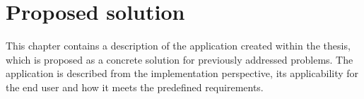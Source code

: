 \chapter{Proposed solution}

This chapter contains a description of the application created within the thesis, which is proposed as a concrete solution for previously addressed problems. The application is described from the implementation perspective, its applicability for the end user and how it meets the predefined requirements.





